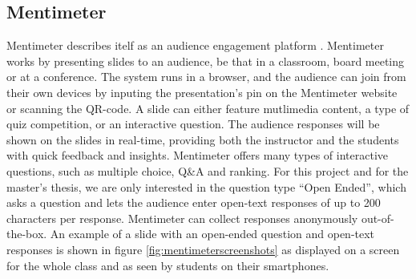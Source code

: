 \subsection{Mentimeter}
Mentimeter describes itelf as an audience engagement platform \cite{mentimeterAudienceResponse}. Mentimeter works by presenting slides to an audience, be that in a classroom, board meeting or at a conference. The system runs in a browser, and the audience can join from their own devices by inputing the presentation's pin on the Mentimeter website or scanning the QR-code. A slide can either feature mutlimedia content, a type of quiz competition, or an interactive question. The audience responses will be shown on the slides in real-time, providing both the instructor and the students with quick feedback and insights. Mentimeter offers many types of interactive questions, such as multiple choice, Q\&A and ranking. For this project and for the master's thesis, we are only interested in the question type ``Open Ended'', which asks a question and lets the audience enter open-text responses of up to 200 characters per response. Mentimeter can collect responses anonymously out-of-the-box. An example of a slide with an open-ended question and open-text responses is shown in figure \ref{fig:mentimeterscreenshots} as displayed on a screen for the whole class and as seen by students on their smartphones.

